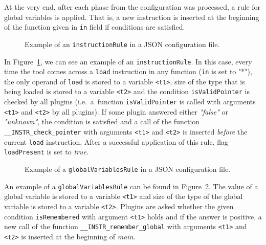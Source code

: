 At the very end, after each phase from the configuration was processed, a rule
for global variables is applied. That is, a new instruction is inserted at the
beginning of the function given in \texttt{in} field if conditions are
satisfied.


\begin{figure}[h]

\caption{Example of an \texttt{instructionRule} in a JSON configuration file.}
\label{fig:json_example}
\end{figure}

In Figure~\ref{fig:json_example}, we can see an example of an
\texttt{instructionRule}. In this case, every time the tool comes across a
\texttt{load} instruction in any function (\texttt{in} is set to "*"), the only
operand of \texttt{load} is stored to a variable \texttt{<t1>}, size of the
type that is being loaded is stored to a variable \texttt{<t2>} and the condition
\texttt{isValidPointer} is checked by all plugins (i.e.~a~function
\texttt{isValidPointer} is called with arguments \texttt{<t1>} and
\texttt{<t2>} by all plugins). If some plugin answered either \emph{"false"} or
\emph{"unknown"}, the condition is satisfied and a call of the function
\texttt{\_\_INSTR\_check\_pointer} with arguments \texttt{<t1>} and
\texttt{<t2>} is inserted \emph{before} the current \texttt{load} instruction.
After a successful application of this rule, flag \texttt{loadPresent} is set
to \emph{true}.

\begin{figure}[h]

\caption{Example of a \texttt{globalVariablesRule} in a JSON configuration file.}
\label{fig:json_example2}
\end{figure}

An example of a \texttt{globalVariablesRule} can be found in
Figure~\ref{fig:json_example2}. The value of a global variable is stored to a
variable \texttt{<t1>} and size of the type of the global variable is stored to
a variable \texttt{<t2>}. Plugins are asked whether the given condition
\texttt{isRemembered} with argument \texttt{<t1>} holds and if the answer is
positive, a new call of the function \texttt{\_\_INSTR\_remember\_global} with
arguments \texttt{<t1>} and \texttt{<t2>} is inserted at the beginning of
\emph{main}.


